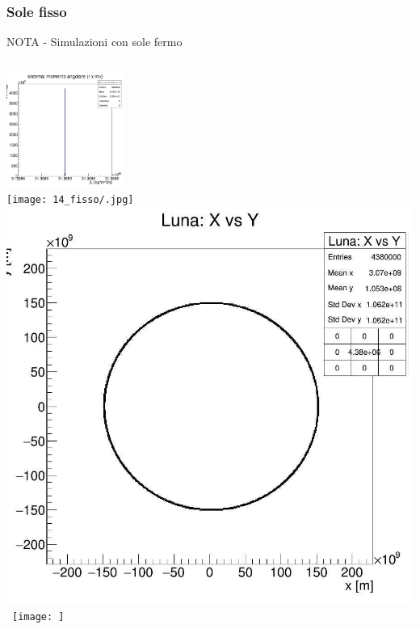     \subsubsection[Fix]{Sole fisso}
        \begin{frame}{NOTA - Simulazioni con sole fermo}
            \begin{columns}
                    \centering
                    \includegraphics[width=\textwidth, height=3.75cm]{14_fisso/sf_Ltot.jpg}\\
                    \texttt{[image: 14\_fisso/.jpg]}
                    \centering
                    \includegraphics[width=\textwidth]{14_fisso/sf_terra_ok.jpg}\\\
                    \texttt{[image: ]}     
            \end{columns}
        \end{frame}
